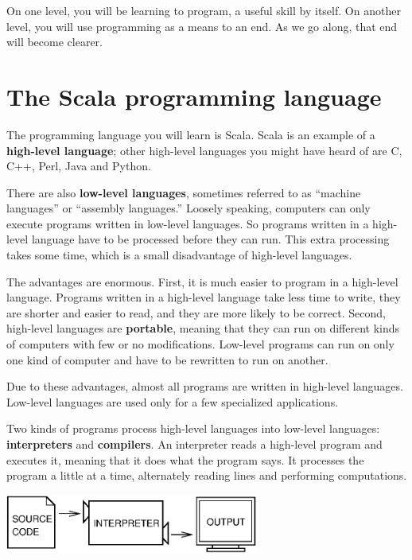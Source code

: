 \documentclass[10pt]{book}
\begin{document}
On one level, you will be learning to program, a useful
skill by itself.  On another level, you will use programming as a means to
an end.  As we go along, that end will become clearer.

\section{The Scala programming language}

The programming language you will learn is Scala. Scala is
an example of a {\bf high-level language}; other high-level languages
you might have heard of are C, C++, Perl, Java and Python.

There are also {\bf low-level languages}, sometimes referred to as ``machine
languages'' or ``assembly languages.''  Loosely speaking, computers
can only execute programs written in low-level languages.  So
programs written in a high-level language have to be processed before
they can run.  This extra processing takes some time, which is a small
disadvantage of high-level languages.


The advantages are enormous.  First, it is much easier to program
in a high-level language.  Programs written in a high-level language
take less time to write, they are shorter and easier to read, and they
are more likely to be correct.  Second, high-level languages are {\bf
portable}, meaning that they can run on different kinds of computers
with few or no modifications.  Low-level programs can run on only one
kind of computer and have to be rewritten to run on another.

Due to these advantages, almost all programs are written in high-level
languages.  Low-level languages are used only for a few specialized
applications.


Two kinds of programs process high-level languages
into low-level languages: {\bf interpreters} and {\bf compilers}.
An interpreter reads a high-level program and executes it, meaning that it
does what the program says.  It processes the program a little at a time,
alternately reading lines and performing computations.

\beforefig
\centerline{\includegraphics[height=0.77in]{figs/interpret.eps}}
\afterfig
\end{document}

